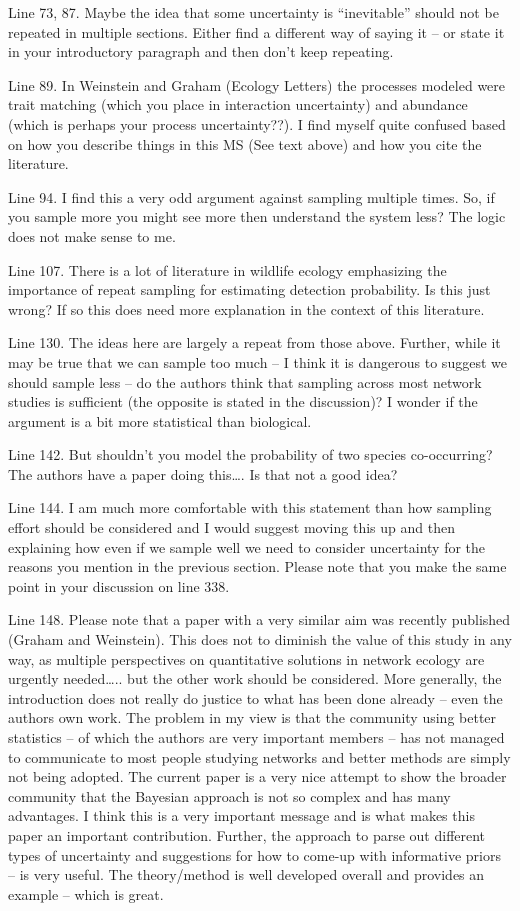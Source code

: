 Line 73, 87.  Maybe the idea that some uncertainty is “inevitable” should not be repeated in multiple sections.  Either find a different way of saying it – or state it in your introductory paragraph and then don’t keep repeating.

Line 89.  In Weinstein and Graham (Ecology Letters) the processes modeled were trait matching (which you place in interaction uncertainty) and abundance (which is perhaps your process uncertainty??).  I find myself quite confused based on how you describe things in this MS (See text above) and how you cite the literature.

Line 94.  I find this a very odd argument against sampling multiple times.  So, if you sample more you might see more then understand the system less?  The logic does not make sense to me. 

Line 107.  There is a lot of literature in wildlife ecology emphasizing the importance of repeat sampling for estimating detection probability.  Is this just wrong?  If so this does need more explanation in the context of this literature.

Line 130.  The ideas here are largely a repeat from those above.  Further, while it may be true that we can sample too much – I think it is dangerous to suggest we should sample less – do the authors think that sampling across most network studies is sufficient (the opposite is stated in the discussion)?  I wonder if the argument is a bit more statistical than biological.

Line 142.  But shouldn’t you model the probability of two species co-occurring?  The authors have a paper doing this…. Is that not a good idea?

Line 144.  I am much more comfortable with this statement than how sampling effort should be considered and I would suggest moving this up and then explaining how even if we sample well we need to consider uncertainty for the reasons you mention in the previous section.  Please note that you make the same point in your discussion on line 338.

Line 148.  Please note that a paper with a very similar aim was recently published (Graham and Weinstein).  This does not to diminish the value of this study in any way, as multiple perspectives on quantitative solutions in network ecology are urgently needed….. but the other work should be considered. More generally, the introduction does not really do justice to what has been done already – even the authors own work.  The problem in my view is that the community using better statistics – of which the authors are very important members – has not managed to communicate to most people studying networks and better methods are simply not being adopted.  The current paper is a very nice attempt to show the broader community that the Bayesian approach is not so complex and has many advantages.  I think this is a very important message and is what makes this paper an important contribution.  Further, the approach to parse out different types of uncertainty and suggestions for how to come-up with informative priors – is very useful.  The theory/method is well developed overall and provides an example – which is great.

